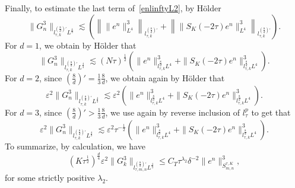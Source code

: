 \documentclass[10pt,a4paper]{article}
\begin{document}
  Finally, to estimate the last term of~\eqref{enlinftyL2}, by H\"older
  \[ \|G_n^3\|_{l^{(\frac8d)'}_{\tau,k}L^\frac43} \lesssim \left(
  \left\| \|e^n\|_{L^4}^3 \right\|_{l^{(\frac8d)'}_{\tau,k}} 
  + \left\| \|S_K(-2\tau)e^n \|_{L^4}^3 \right\|_{l^{(\frac8d)'}_{\tau,k}}\right). \]
  For \(d=1\), we obtain by H\"older that 
  \begin{equation*}%
    \|G_n^3\|_{l^{(\frac8d)'}_{\tau,k}L^\frac43} \lesssim 
    (N\tau)^\frac12 \left(
    \|e^n\|^3_{l^\frac8d_{\tau,k}L^4} + \|S_K(-2\tau)e^n\|_{l^\frac8d_{\tau,k}L^4}^3\right).
  \end{equation*}
  For \(d=2\), since \((\frac8d)' = \frac13\frac8d\), we obtain again by
  H\"older that 
  \begin{equation*}%
    \varepsilon^2 \|G_n^3\|_{l^{(\frac8d)'}_{\tau,k}L^\frac43} \lesssim \varepsilon^2
    \left(\|e^n\|^3_{l^\frac8d_{\tau,k}L^4} + \|S_K(-2\tau)e^n\|_{l^\frac8d_{\tau,k}L^4}^3\right).
  \end{equation*}
  For \(d=3\), since \((\frac8d)' > \frac13\frac8d\), we use again by reverse
  inclusion of \(l^p_\tau\) to get that 
  \begin{equation*}%
    \varepsilon^2 \|G_n^3\|_{l^{(\frac8d)'}_{\tau,k}L^\frac43} \lesssim \varepsilon^2 \tau^{-\frac12}
    \left(\|e^n\|^3_{l^\frac8d_{\tau,k}L^4} + \|S_K(-2\tau)e^n\|_{l^\frac8d_{\tau,k}L^4}^3\right).
  \end{equation*}
  To summarize, by calculation, we have 
  \begin{equation}\label{G3}
    (K\tau^\frac12)^\frac d4 
    \varepsilon^2\|G_k^3\|_{l^{(\frac8d)'}_{\tau,m,n}L^\frac43}
    \leq C_T \tau^{\lambda_2} \delta^{-2}
    \|e^n\|_{S^{\tau,K}_{m,n}}^3,
  \end{equation}
  for some strictly positive \(\lambda_2\).
\end{document}
